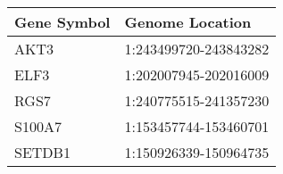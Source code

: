 \begin{tabular}{ll}
\toprule
Gene Symbol &       Genome Location \\
\midrule
       AKT3 & 1:243499720-243843282 \\
       ELF3 & 1:202007945-202016009 \\
       RGS7 & 1:240775515-241357230 \\
     S100A7 & 1:153457744-153460701 \\
     SETDB1 & 1:150926339-150964735 \\
\bottomrule
\end{tabular}
